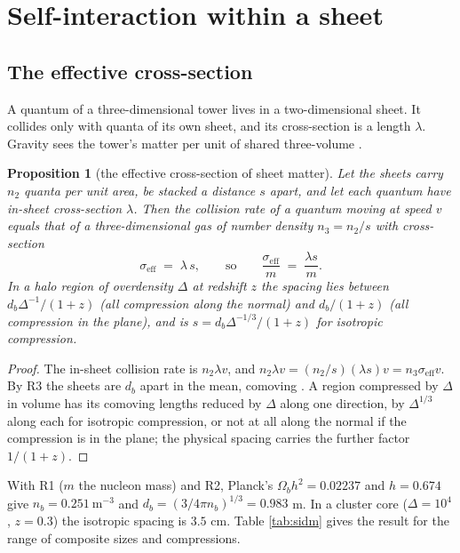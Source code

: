 \documentclass[11pt]{article}
\newtheorem{proposition}[theorem]{Proposition}
\theoremstyle{definition}
\begin{document}
\section{Self-interaction within a sheet}\label{sec:sidm}

\subsection{The effective cross-section}

A quantum of a three-dimensional tower lives in a two-dimensional sheet. It collides only with quanta of its own sheet, and its cross-section is a length $\lambda$. Gravity sees the tower's matter per unit of shared three-volume \cite[Lem.~6.1]{ButlerT14}.

\begin{proposition}[the effective cross-section of sheet matter]\label{prop:sigmaeff}
Let the sheets carry $n_{2}$ quanta per unit area, be stacked a distance $s$ apart, and let each quantum have in-sheet cross-section $\lambda$. Then the collision rate of a quantum moving at speed $v$ equals that of a three-dimensional gas of number density $n_{3} = n_{2}/s$ with cross-section
\[
\sigma_{\mathrm{eff}} \;=\; \lambda\, s ,
\qquad\text{so}\qquad
\frac{\sigma_{\mathrm{eff}}}{m} \;=\; \frac{\lambda s}{m}.
\]
In a halo region of overdensity $\Delta$ at redshift $z$ the spacing lies between $d_{b}\Delta^{-1}/(1+z)$ (all compression along the normal) and $d_{b}/(1+z)$ (all compression in the plane), and is $s = d_{b}\Delta^{-1/3}/(1+z)$ for isotropic compression.
\end{proposition}

\begin{proof}
The in-sheet collision rate is $n_{2}\lambda v$, and $n_{2}\lambda v = (n_{2}/s)(\lambda s)v = n_{3}\sigma_{\mathrm{eff}}v$. By R3 the sheets are $d_{b}$ apart in the mean, comoving \cite[Prem.~7.4]{ButlerT14}. A region compressed by $\Delta$ in volume has its comoving lengths reduced by $\Delta$ along one direction, by $\Delta^{1/3}$ along each for isotropic compression, or not at all along the normal if the compression is in the plane; the physical spacing carries the further factor $1/(1+z)$.
\end{proof}

With R1 ($m$ the nucleon mass) and R2, Planck's $\Omega_{b}h^{2} = 0.02237$ and $h = 0.674$ give $n_{b} = 0.251\ \mathrm{m^{-3}}$ and $d_{b} = (3/4\pi n_{b})^{1/3} = 0.983$ m. In a cluster core ($\Delta = 10^{4}$, $z = 0.3$) the isotropic spacing is $3.5$ cm. Table \ref{tab:sidm} gives the result for the range of composite sizes and compressions.
\end{document}
